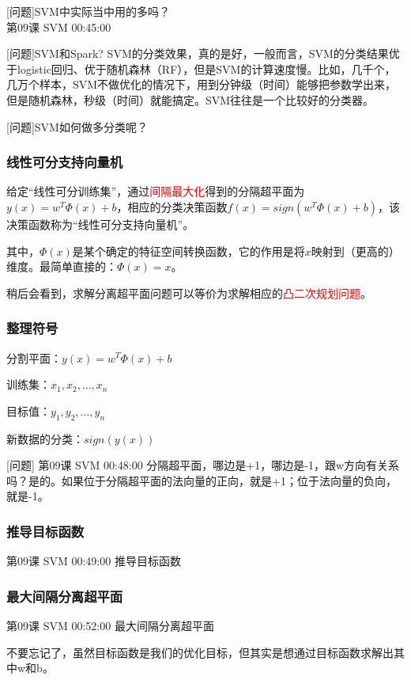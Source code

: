 \documentclass[UTF8]{ctexbook}
\begin{document}
[问题]SVM中实际当中用的多吗？\\ 第09课 SVM 00:45:00

[问题]SVM和Spark? SVM的分类效果，真的是好，一般而言，SVM的分类结果优于logistic回归、优于随机森林（RF），但是SVM的计算速度慢。比如，几千个，几万个样本，SVM不做优化的情况下，用到分钟级（时间）能够把参数学出来，但是随机森林，秒级（时间）就能搞定。SVM往往是一个比较好的分类器。

[问题]SVM如何做多分类呢？

\subsubsection{线性可分支持向量机}

给定“线性可分训练集”，通过\textcolor{red}{间隔最大化}得到的分隔超平面为$y(x)=w^{T} \Phi (x) + b$，相应的分类决策函数$f(x)=sign(w^{T} \Phi (x) + b)$，该决策函数称为“线性可分支持向量机”。

其中，$\Phi (x)$是某个确定的特征空间转换函数，它的作用是将$x$映射到（更高的）维度。最简单直接的：$\Phi (x)=x$。

稍后会看到，求解分离超平面问题可以等价为求解相应的\textcolor{red}{凸二次规划问题}。

\subsubsection{整理符号}

分割平面：$y(x)=w^{T} \Phi (x) + b$

训练集：$x_{1},x_{2}, \dots ,x_{n}$

目标值：$y_{1},y_{2}, \dots ,y_{n}$

新数据的分类：$sign(y(x))$

[问题] 第09课 SVM 00:48:00 分隔超平面，哪边是+1，哪边是-1，跟w方向有关系吗？是的。如果位于分隔超平面的法向量的正向，就是+1；位于法向量的负向，就是-1。

\subsubsection{推导目标函数}

第09课 SVM 00:49:00 推导目标函数

\subsubsection{最大间隔分离超平面}

第09课 SVM 00:52:00 最大间隔分离超平面

不要忘记了，虽然目标函数是我们的优化目标，但其实是想通过目标函数求解出其中w和b。
\end{document}
